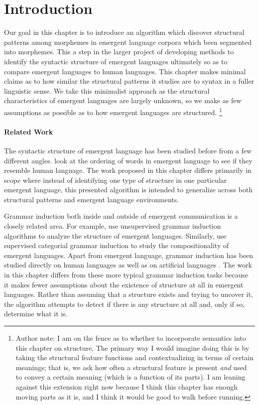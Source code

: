 \newcommand\tsc\textsc

\section{Introduction}

Our goal in this chapter is to introduce an algorithm which discover structural patterns among morphemes in emergent language corpora which been segmented into morphemes.
This a step in the larger project of developing methods to identify the syntactic structure of emergent languages ultimately so as to compare emergent languages to human languages.
This chapter makes minimal claims as to how similar the structural patterns it studies are to syntax in a fuller linguistic sense.
We take this minimalist approach as the structural characteristics of emergent languages are largely unknown, so we make as few assumptions as possible as to how emergent languages are structured.
\unskip\footnote{Author note: I am on the fence as to whether to incorporate semantics into this chapter on structure. The primary way I would imagine doing this is by taking the structural feature functions and contextualizing in terms of certain meanings; that is, we ask how often a structural feature is present \emph{and} used to convey a certain meaning (which is a function of its parts).  I am leaning against this extension right now because I think this chapter has enough moving parts as it is, and I think it would be good to walk before running.}

\paragraph{Related Work}
The syntactic structure of emergent language has been studied before from a few different angles.
 look at the ordering of words in emergent language to see if they resemble human language.
The work proposed in this chapter differs primarily in scope where instead of identifying one type of structure in one particular emergent language, this presented algorithm is intended to generalize across both structural patterns and emergent language environments.

Grammar induction both inside and outside of emergent communication is a closely related area.
For example, \citet{van-der-wal-etal-2020-grammar} use unsupervised grammar induction algorithms to analyze the structure of emergent languages.
Similarly, \citet{ueda2022categorial} use supervised categorial grammar induction to study the compositionality of emergent languages.
Apart from emergent language, grammar induction has been studied directly on human languages \citep{kim-etal-2019-unsupervised,kim-etal-2019-compound} as well as on artificial languages \citep{Kirby_2002,brighton2003thesis}.
The work in this chapter differs from these more typical grammar induction tasks because it makes fewer assumptions about the existence of structure at all in emergent languages.
Rather than assuming that a structure exists and trying to uncover it, the algorithm attempts to detect if there is any structure at all and, only if so, determine what it is.


